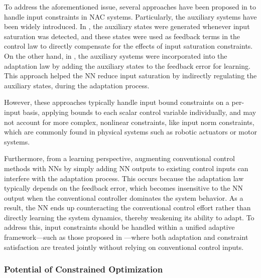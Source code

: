 \documentclass[letterpaper, journal]{IEEEtran}
\begin{document}
To address the aforementioned issue, several approaches have been proposed in \cite{Gao:2006aa,Arefinia:2020aa,He:2016aa,Peng:2020aa,Esfandiari:2014aa,Karason:1994aa,Esfandiari:2015aa} to handle input constraints in NAC systems.
Particularly, the auxiliary systems have been widely introduced.
In \cite{Arefinia:2020aa,He:2016aa,Peng:2020aa}, the auxiliary states were generated whenever input saturation was detected, and these states were used as feedback terms in the control law to directly compensate for the effects of input saturation constraints.
On the other hand, in \cite{Esfandiari:2014aa,Karason:1994aa,Esfandiari:2015aa}, the auxiliary systems were incorporated into the adaptation law by adding the auxiliary states to the feedback error for learning.
This approach helped the NN reduce input saturation by indirectly regulating the auxiliary states, during the adaptation process.

However, these approaches typically handle input bound constraints on a per-input basis, \ie applying bounds to each scalar control variable individually, and may not account for more complex, nonlinear constraints, like input norm constraints, which are commonly found in physical systems such as robotic actuators or motor systems.

Furthermore, from a learning perspective, augmenting conventional control methods with NNs by simply adding NN outputs to existing control inputs can interfere with the adaptation process. 
This occurs because the adaptation law typically depends on the feedback error, which becomes insensitive to the NN output when the conventional controller dominates the system behavior. 
As a result, the NN ends up counteracting the conventional control effort rather than directly learning the system dynamics, thereby weakening its ability to adapt.
To address this, input constraints should be handled within a unified adaptive framework—such as those proposed in \cite{Esfandiari:2014aa,Karason:1994aa,Esfandiari:2015aa}—where both adaptation and constraint satisfaction are treated jointly without relying on conventional control inputs.

\hfill

\subsubsection{Potential of Constrained Optimization}
\end{document}
